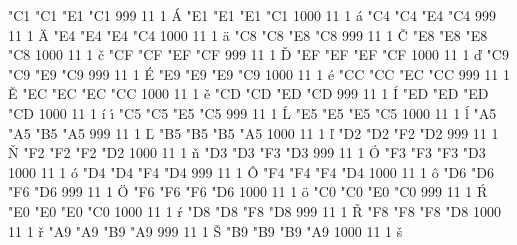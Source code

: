 
\ifx\xordcode\undefined  %
   \let\orierrmessage=\errmessage  \let\errmessage=\message \fi

  

\ifx\errmessage\message
   \let\errmessage=\orierrmessage  \let\orierrmessage=\undefined \fi

\setcharcode  "C1  "C1  "E1  "C1   999  11  1  \texaccent \'A
\setcharcode  "E1  "E1  "E1  "C1  1000  11  1  \texaccent \'a
\setcharcode  "C4  "C4  "E4  "C4   999  11  1  \texaccent \"A
\setcharcode  "E4  "E4  "E4  "C4  1000  11  1  \texaccent \"a
\setcharcode  "C8  "C8  "E8  "C8   999  11  1  \texaccent \v C
\setcharcode  "E8  "E8  "E8  "C8  1000  11  1  \texaccent \v c
\setcharcode  "CF  "CF  "EF  "CF   999  11  1  \texaccent \v D
\setcharcode  "EF  "EF  "EF  "CF  1000  11  1  \texaccent \v d
\setcharcode  "C9  "C9  "E9  "C9   999  11  1  \texaccent \'E
\setcharcode  "E9  "E9  "E9  "C9  1000  11  1  \texaccent \'e
\setcharcode  "CC  "CC  "EC  "CC   999  11  1  \texaccent \v E
\setcharcode  "EC  "EC  "EC  "CC  1000  11  1  \texaccent \v e
\setcharcode  "CD  "CD  "ED  "CD   999  11  1  \texaccent \'I
\setcharcode  "ED  "ED  "ED  "CD  1000  11  1  \texaccent \'i  \texaccent \'\i
\setcharcode  "C5  "C5  "E5  "C5   999  11  1  \texaccent \'L
\setcharcode  "E5  "E5  "E5  "C5  1000  11  1  \texaccent \'l
\setcharcode  "A5  "A5  "B5  "A5   999  11  1  \texaccent \v L
\setcharcode  "B5  "B5  "B5  "A5  1000  11  1  \texaccent \v l
\setcharcode  "D2  "D2  "F2  "D2   999  11  1  \texaccent \v N
\setcharcode  "F2  "F2  "F2  "D2  1000  11  1  \texaccent \v n
\setcharcode  "D3  "D3  "F3  "D3   999  11  1  \texaccent \'O
\setcharcode  "F3  "F3  "F3  "D3  1000  11  1  \texaccent \'o
\setcharcode  "D4  "D4  "F4  "D4   999  11  1  \texaccent \^O
\setcharcode  "F4  "F4  "F4  "D4  1000  11  1  \texaccent \^o
\setcharcode  "D6  "D6  "F6  "D6   999  11  1  \texaccent \"O
\setcharcode  "F6  "F6  "F6  "D6  1000  11  1  \texaccent \"o
\setcharcode  "C0  "C0  "E0  "C0   999  11  1  \texaccent \'R
\setcharcode  "E0  "E0  "E0  "C0  1000  11  1  \texaccent \'r
\setcharcode  "D8  "D8  "F8  "D8   999  11  1  \texaccent \v R
\setcharcode  "F8  "F8  "F8  "D8  1000  11  1  \texaccent \v r
\setcharcode  "A9  "A9  "B9  "A9   999  11  1  \texaccent \v S
\setcharcode  "B9  "B9  "B9  "A9  1000  11  1  \texaccent \v s
